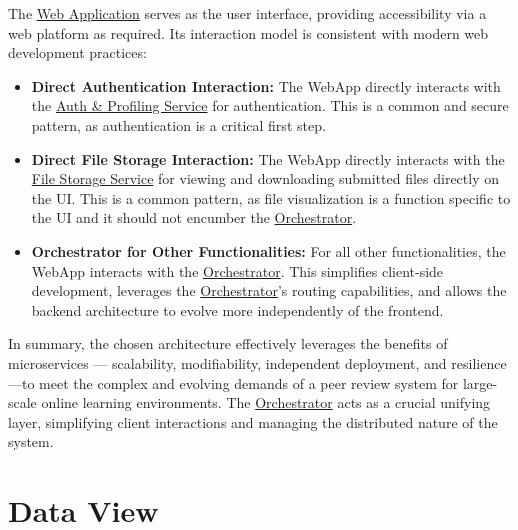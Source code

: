 \begin{justify}
    The \hyperref[def:WebApplication]{Web Application} serves as the user interface, providing accessibility via a web platform as required. Its interaction model is consistent with modern web development practices:
\end{justify}
\begin{itemize}
    \item \textbf{Direct Authentication Interaction:} The WebApp directly interacts with the \hyperref[def:AuthProfilingService]{Auth \& Profiling Service} for authentication. This is a common and secure pattern, as authentication is a critical first step.
    \item \textbf{Direct File Storage Interaction:} The WebApp directly interacts with the \hyperref[def:FileStorageService]{File Storage Service} for viewing and downloading submitted files directly on the UI. This is a common pattern, as file visualization is a function specific to the UI and it should not encumber the \hyperref[def:Orchestrator]{Orchestrator}.
    \item \textbf{Orchestrator for Other Functionalities:} For all other functionalities, the WebApp interacts with the \hyperref[def:Orchestrator]{Orchestrator}. This simplifies client-side development, leverages the \hyperref[def:Orchestrator]{Orchestrator}'s routing capabilities, and allows the backend architecture to evolve more independently of the frontend.
\end{itemize}
\begin{justify}
    In summary, the chosen architecture effectively leverages the benefits of microservices — scalability, modifiability, independent deployment, and resilience—to meet the complex and evolving demands of a peer review system for large-scale online learning environments. The \hyperref[def:Orchestrator]{Orchestrator} acts as a crucial unifying layer, simplifying client interactions and managing the distributed nature of the system.
\end{justify}
\clearpage

\section{Data View}

